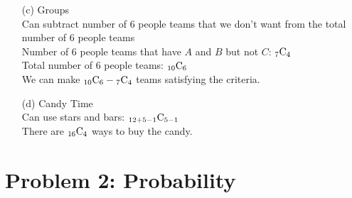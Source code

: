\documentclass[12pt, leqno]{article}
\begin{document}
\begin{enumerate}
    \item[(c)] Groups\\
    Can subtract number of 6 people teams that we don't want from the total number of 6 people teams\\
    Number of 6 people teams that have $A$ and $B$ but not $C$: ${}_{7}\mathrm{C}_{4}$\\
    Total number of 6 people teams: ${}_{10}\mathrm{C}_{6}$\\
    We can make ${}_{10}\mathrm{C}_{6} - {}_{7}\mathrm{C}_{4}$ teams satisfying the criteria.
    \item[(d)] Candy Time\\
    Can use stars and bars: ${}_{12 + 5 - 1}\mathrm{C}_{5 - 1}$\\
    There are ${}_{16}\mathrm{C}_{4}$ ways to buy the candy.
\end{enumerate}

\pagebreak

\section*{Problem 2: Probability}
\end{document}
